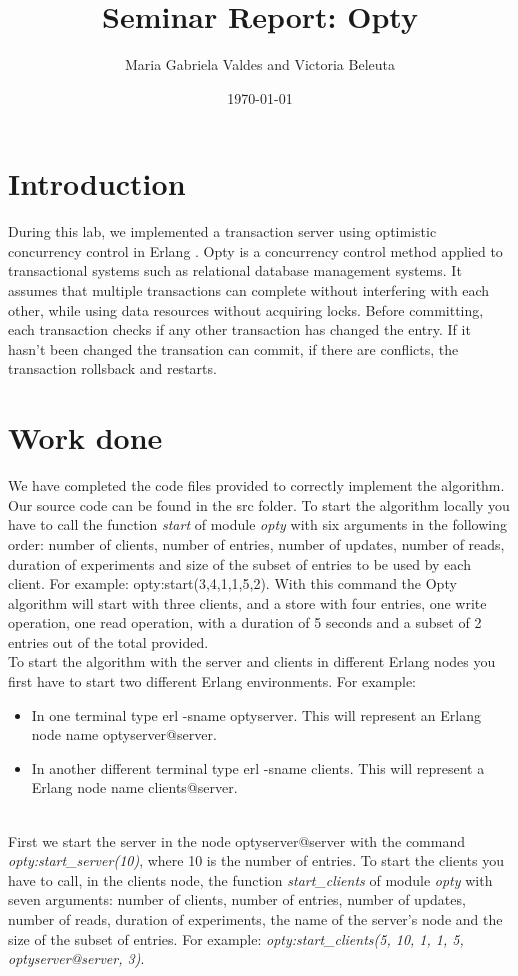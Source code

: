 \documentclass[a4paper, 11pt]{article}
\title{Seminar Report: Opty}
\author{Maria Gabriela Valdes and Victoria Beleuta}
\date{\today{}}
\begin{document}
\maketitle

\section{Introduction}

During this lab, we implemented a transaction server using optimistic concurrency control in Erlang . Opty is a concurrency control method applied to transactional systems such as relational database management systems. It assumes that multiple transactions can complete without interfering with each other, while using data resources without acquiring locks. Before committing, each transaction checks if any other transaction has changed the entry. If it hasn't been changed the transation can commit, if there are conflicts, the transaction rollsback and restarts.
 
\section{Work done}

We have completed the code files provided to correctly implement the algorithm. Our source code can be found in the src folder. To start the algorithm locally you have to call the function \textit{start} of module \textit{opty} with six arguments in the following order: number of clients, number of entries, number of updates, number of reads, duration of experiments and size of the subset of entries to be used by each client. For example: opty:start(3,4,1,1,5,2). With this command the Opty algorithm will start with three clients, and a store with four entries, one write operation, one read operation, with a duration of 5 seconds and a subset of 2 entries out of the total provided. \\
To start the algorithm with the server and clients in different Erlang nodes you first have to start two different Erlang environments. For example:
\begin{itemize}
\item In one terminal type erl -sname optyserver. This will represent an Erlang node name optyserver@server.\\
\item In another different terminal type erl -sname clients. This will represent a Erlang node name clients@server.\\
\end{itemize}\\
%
First we start the server in the node optyserver@server with the command \textit{opty:start\_server(10)}, where 10 is the number of entries. To start the clients you have to call, in the clients node, the function \textit{start\_clients} of module \textit{opty} with seven arguments: number of clients, number of entries, number of updates, number of reads, duration of experiments, the name of the server’s node and the size of the subset of entries. For example: 
\textit{opty:start\_clients(5, 10, 1, 1, 5, optyserver@server, 3)}.\\
\end{document}

